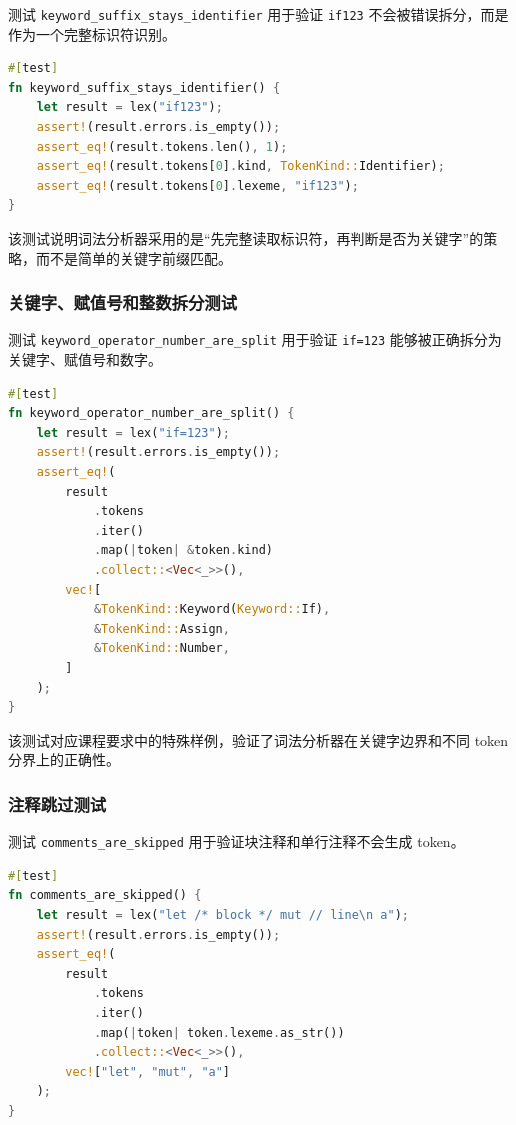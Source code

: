 \documentclass[UTF8,a4paper,12pt]{ctexart}
\begin{document}
测试 \texttt{keyword\_suffix\_stays\_identifier} 用于验证 \texttt{if123} 不会被错误拆分，而是作为一个完整标识符识别。

\begin{lstlisting}[language=Rust,caption={关键字后缀测试}]
#[test]
fn keyword_suffix_stays_identifier() {
    let result = lex("if123");
    assert!(result.errors.is_empty());
    assert_eq!(result.tokens.len(), 1);
    assert_eq!(result.tokens[0].kind, TokenKind::Identifier);
    assert_eq!(result.tokens[0].lexeme, "if123");
}
\end{lstlisting}

该测试说明词法分析器采用的是“先完整读取标识符，再判断是否为关键字”的策略，而不是简单的关键字前缀匹配。

\subsubsection{关键字、赋值号和整数拆分测试}

测试 \texttt{keyword\_operator\_number\_are\_split} 用于验证 \texttt{if=123} 能够被正确拆分为关键字、赋值号和数字。

\begin{lstlisting}[language=Rust,caption={关键字、赋值号和整数拆分测试}]
#[test]
fn keyword_operator_number_are_split() {
    let result = lex("if=123");
    assert!(result.errors.is_empty());
    assert_eq!(
        result
            .tokens
            .iter()
            .map(|token| &token.kind)
            .collect::<Vec<_>>(),
        vec![
            &TokenKind::Keyword(Keyword::If),
            &TokenKind::Assign,
            &TokenKind::Number,
        ]
    );
}
\end{lstlisting}

该测试对应课程要求中的特殊样例，验证了词法分析器在关键字边界和不同 token 分界上的正确性。

\subsubsection{注释跳过测试}

测试 \texttt{comments\_are\_skipped} 用于验证块注释和单行注释不会生成 token。

\begin{lstlisting}[language=Rust,caption={注释跳过测试}]
#[test]
fn comments_are_skipped() {
    let result = lex("let /* block */ mut // line\n a");
    assert!(result.errors.is_empty());
    assert_eq!(
        result
            .tokens
            .iter()
            .map(|token| token.lexeme.as_str())
            .collect::<Vec<_>>(),
        vec!["let", "mut", "a"]
    );
}
\end{lstlisting}
\end{document}
